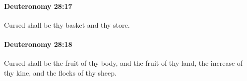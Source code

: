 		\paragraph{Deuteronomy 28:17} %
			\label{DEUTERONOMY-28-17}

			Cursed shall be thy basket and thy store.


		\paragraph{Deuteronomy 28:18} %
			\label{DEUTERONOMY-28-18}

			Cursed shall be the fruit of thy body, and the fruit of thy land, the increase of thy kine, and the flocks of thy sheep.


